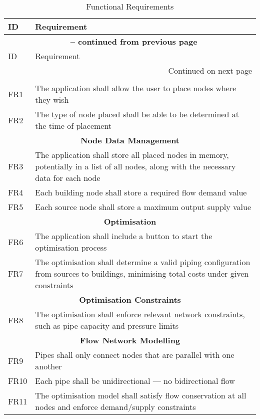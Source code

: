 \begin{longtable}{l p{13cm}}
\caption{Functional Requirements}\label{table:functionalrequirements} \\
\toprule
ID & Requirement \\
\midrule
\endfirsthead

\multicolumn{2}{c}{{\bfseries \tablename\ \thetable{} -- continued from previous page}} \\
\toprule
ID & Requirement \\
\midrule
\endhead

\midrule \multicolumn{2}{r}{{Continued on next page}} \\
\endfoot

\bottomrule
\endlastfoot

\multicolumn{2}{c}{\textbf{Node Placement}} \\
FR1 & The application shall allow the user to place nodes where they wish \\
FR2 & The type of node placed shall be able to be determined at the time of placement \\

\midrule
\multicolumn{2}{c}{\textbf{Node Data Management}} \\
FR3 & The application shall store all placed nodes in memory, potentially in a list of all nodes, along with the necessary data for each node \\
FR4 & Each building node shall store a required flow demand value \\
FR5 & Each source node shall store a maximum output supply value \\

\midrule
\multicolumn{2}{c}{\textbf{Optimisation}} \\
FR6 & The application shall include a button to start the optimisation process \\
FR7 & The optimisation shall determine a valid piping configuration from sources to buildings, minimising total costs under given constraints \\

\midrule
\multicolumn{2}{c}{\textbf{Optimisation Constraints}} \\
FR8 & The optimisation shall enforce relevant network constraints, such as pipe capacity and pressure limits \\

\midrule
\multicolumn{2}{c}{\textbf{Flow Network Modelling}} \\
FR9 & Pipes shall only connect nodes that are parallel with one another \\
FR10 & Each pipe shall be unidirectional — no bidirectional flow \\
FR11 & The optimisation model shall satisfy flow conservation at all nodes and enforce demand/supply constraints \\


\end{longtable}

